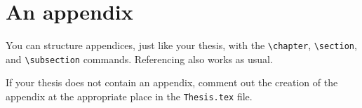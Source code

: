 \chapter{An appendix}

You can structure appendices, just like your thesis, with the \verb*|\chapter|, \verb*|\section|, and \verb*|\subsection| commands. Referencing also works as usual.

If your thesis does not contain an appendix, comment out the creation of the appendix at the appropriate place in the \texttt{Thesis.tex} file.